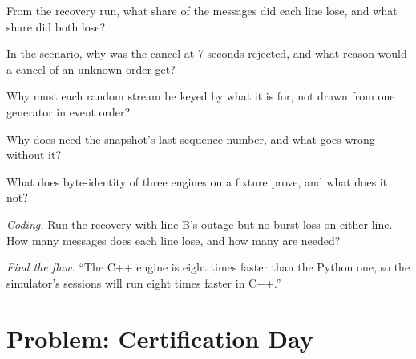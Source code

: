 \begin{exercise}[$\star$]\label{exo:mx:build-a-matching-engine-and-exchange-simulator:2}
From the recovery run, what share of the messages did each line lose, and what share did both lose?
\end{exercise}

\begin{exercise}[$\star$]\label{exo:mx:build-a-matching-engine-and-exchange-simulator:3}
In the scenario, why was the cancel at 7 seconds rejected, and what reason would a cancel of an unknown order get?
\end{exercise}

\begin{exercise}[$\star\star$]\label{exo:mx:build-a-matching-engine-and-exchange-simulator:4}
Why must each random stream be keyed by what it is for, not drawn from one generator in event order?
\end{exercise}

\begin{exercise}[$\star\star$]\label{exo:mx:build-a-matching-engine-and-exchange-simulator:5}
Why does  need the snapshot's last sequence number, and what goes wrong without it?
\end{exercise}

\begin{exercise}[$\star\star$]\label{exo:mx:build-a-matching-engine-and-exchange-simulator:6}
What does byte-identity of three engines on a fixture prove, and what does it not?
\end{exercise}

\begin{exercise}[$\star\star\star$]\label{exo:mx:build-a-matching-engine-and-exchange-simulator:7}
\emph{Coding.} Run the recovery with line B's outage but no burst loss on either line. How many messages does each line lose, and how many
 are needed?
\end{exercise}

\begin{exercise}[$\star\star\star$]\label{exo:mx:build-a-matching-engine-and-exchange-simulator:8}
\emph{Find the flaw.} ``The C++ engine is eight times faster than the Python one, so the simulator's sessions will run eight times faster in C++.''
\end{exercise}

\section{Problem: Certification Day}

